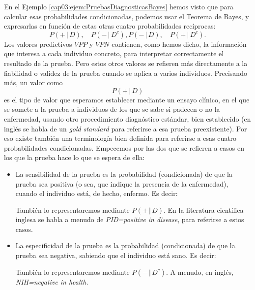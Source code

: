 En el Ejemplo \ref{cap03:ejem:PruebasDiagnosticasBayes} hemos visto que para calcular esas probabilidades condicionadas, podemos usar el Teorema de Bayes, y expresarlas en función de estas otras cuatro probabilidades recíprocas:
\[P(+\,|\,D),\quad P(-\,|\,D^c), P(-\,|\,D),\quad  P(+\,|\,D^c).\]
Los valores predictivos $VPP$ y $VPN$ contienen, como hemos dicho, la información que interesa a cada individuo concreto, para interpretar correctamente el resultado de la prueba. Pero estos otros valores se refieren más directamente a la fiabilidad o validez de la prueba cuando se aplica a varios individuos. Precisando más, un valor como
\[
P(+\,|\,D)
\]
es el tipo de valor que esperamos establecer mediante un ensayo clínico, en el que se somete a la
prueba a individuos de los que se sabe si padecen o no la enfermedad, usando otro procedimiento
diagnóstico estándar, bien establecido (en inglés se habla de un {\em gold standard} para referirse a esa prueba preexistente). Por eso existe también una terminología bien
definida para referirse a esas cuatro probabilidades condicionadas. Empecemos por las dos que se
refieren a casos en los que la prueba hace lo que se espera de ella:
 \begin{itemize}
    \item La {\sf sensibilidad} de la prueba es la probabilidad (condicionada) de que la prueba sea positiva (o sea, que indique la presencia de la enfermedad), cuando el individuo está, de hecho, enfermo. Es decir:

            \begin{center}
            \end{center}
        También lo representaremos mediante $P(+\,|\,D)$. En la literatura científica inglesa se habla a menudo de {\em PID=positive in disease}, para referirse a estos casos.

    \item La {\sf especificidad} de la prueba es la probabilidad (condicionada) de que la prueba sea negativa, sabiendo que el individuo está sano. Es decir:
            \begin{center}
            \end{center}
        También lo representaremos mediante $P(-\,|\,D^c)$. A menudo, en inglés, {\em NIH=negative in health.}
 \end{itemize}
